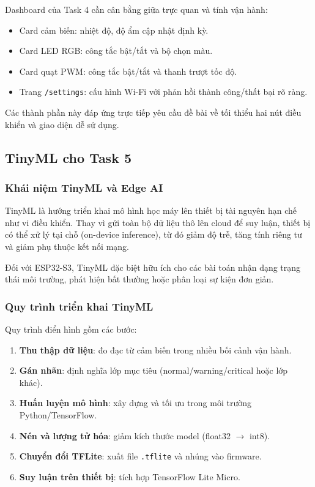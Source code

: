 Dashboard của Task 4 cần cân bằng giữa trực quan và tính vận hành:
\begin{itemize}
    \item Card cảm biến: nhiệt độ, độ ẩm cập nhật định kỳ.
    \item Card LED RGB: công tắc bật/tắt và bộ chọn màu.
    \item Card quạt PWM: công tắc bật/tắt và thanh trượt tốc độ.
    \item Trang \texttt{/settings}: cấu hình Wi-Fi với phản hồi thành công/thất bại rõ ràng.
\end{itemize}

Các thành phần này đáp ứng trực tiếp yêu cầu đề bài về tối thiểu hai nút điều khiển và giao diện dễ sử dụng.

\subsection{TinyML cho Task 5}

\subsubsection*{Khái niệm TinyML và Edge AI}

TinyML là hướng triển khai mô hình học máy lên thiết bị tài nguyên hạn chế như vi điều khiển. Thay vì gửi toàn bộ dữ liệu thô lên cloud để suy luận, thiết bị có thể xử lý tại chỗ (on-device inference), từ đó giảm độ trễ, tăng tính riêng tư và giảm phụ thuộc kết nối mạng.

Đối với ESP32-S3, TinyML đặc biệt hữu ích cho các bài toán nhận dạng trạng thái môi trường, phát hiện bất thường hoặc phân loại sự kiện đơn giản.

\subsubsection*{Quy trình triển khai TinyML}

Quy trình điển hình gồm các bước:
\begin{enumerate}
    \item \textbf{Thu thập dữ liệu}: đo đạc từ cảm biến trong nhiều bối cảnh vận hành.
    \item \textbf{Gán nhãn}: định nghĩa lớp mục tiêu (normal/warning/critical hoặc lớp khác).
    \item \textbf{Huấn luyện mô hình}: xây dựng và tối ưu trong môi trường Python/TensorFlow.
    \item \textbf{Nén và lượng tử hóa}: giảm kích thước model (float32 \(\rightarrow\) int8).
    \item \textbf{Chuyển đổi TFLite}: xuất file \texttt{.tflite} và nhúng vào firmware.
    \item \textbf{Suy luận trên thiết bị}: tích hợp TensorFlow Lite Micro.
\end{enumerate}

